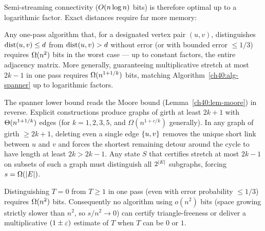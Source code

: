 Semi-streaming connectivity ($O(n\log n)$ bits) is therefore optimal up to a
logarithmic factor. Exact distances require far more memory:

\begin{theorem}\label{ch40:thm-lb-dist}
Any one-pass algorithm that, for a designated vertex pair $(u,v)$, distinguishes
$\operatorname{dist}(u,v)\le d$ from $\operatorname{dist}(u,v)>d$ without error (or with bounded error
$\le 1/3$) requires $\Omega(n^2)$ bits in the worst case --- up to constant
factors, the entire adjacency matrix. More generally, guaranteeing multiplicative
stretch at most $2k-1$ in one pass requires $\Omega(n^{1+1/k})$ bits, matching
Algorithm~\ref{ch40:alg-spanner} up to logarithmic factors.
\end{theorem}

\begin{intuitionbox}
The spanner lower bound reads the Moore bound (Lemma~\ref{ch40:lem-moore}) in
reverse. Explicit constructions produce graphs of girth at least $2k+1$ with
$\Theta(n^{1+1/k})$ edges (for $k=1,2,3,5$, and $\Omega(n^{1+c/k})$ generally). In
any graph of girth $\ge 2k+1$, deleting even a single edge $\{u,v\}$ removes
the unique short link between $u$ and $v$ and forces the shortest remaining
detour around the cycle to have length at least $2k > 2k-1$. Any state $S$ that
certifies stretch at most $2k-1$ on subsets of such a graph must distinguish all
$2^{\lvert E\rvert}$ subgraphs, forcing $s = \Omega(\lvert E\rvert)$.
\end{intuitionbox}

\begin{theorem}\label{ch40:thm-lb-tri}
Distinguishing $T=0$ from $T\ge 1$ in one pass (even with error probability
$\le 1/3$) requires $\Omega(n^2)$ bits. Consequently no algorithm using $o(n^2)$
bits (space growing strictly slower than $n^2$, so $s/n^2 \to 0$) can certify
triangle-freeness or deliver a multiplicative $(1\pm\varepsilon)$ estimate of $T$ when
$T$ can be $0$ or $1$.
\end{theorem}

